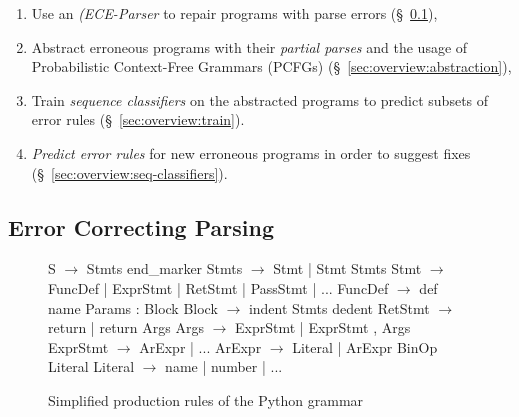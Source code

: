 \begin{enumerate}

  \item Use an \emph{(ECE-Parser} to repair programs with parse errors
  (\S~\ref{sec:overview:ec-parsing}),

  \item Abstract erroneous programs with their \emph{partial parses} and the
  usage of Probabilistic Context-Free Grammars (PCFGs)
  (\S~\ref{sec:overview:abstraction}),

  \item Train \emph{sequence classifiers} on the abstracted programs to predict
  subsets of error rules (\S~\ref{sec:overview:train}).

  \item \emph{Predict error rules} for new erroneous programs in order to
  suggest fixes (\S~\ref{sec:overview:seq-classifiers}).

\end{enumerate}

\subsection{Error Correcting Parsing}
\label{sec:overview:ec-parsing}

\begin{figure}[t]
\begin{rules}
S        $\rightarrow$ Stmts end_marker
Stmts    $\rightarrow$ Stmt \n | Stmt \n Stmts
Stmt     $\rightarrow$ FuncDef | ExprStmt | RetStmt | PassStmt | ...
FuncDef  $\rightarrow$ def name Params : Block
Block    $\rightarrow$ \n indent Stmts dedent
RetStmt  $\rightarrow$ return | return Args
Args     $\rightarrow$ ExprStmt | ExprStmt , Args
ExprStmt $\rightarrow$ ArExpr | ...
ArExpr   $\rightarrow$ Literal | ArExpr BinOp Literal
Literal  $\rightarrow$ name | number | ...
\end{rules}
\caption{Simplified production rules of the Python grammar}
\label{fig:production-rules}
\end{figure}

